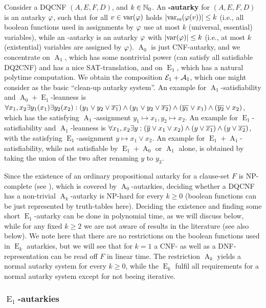 \documentclass[conference]{IEEEtran}
\DeclareMathOperator{\varess}{\var_{es}} %
\DeclareMathOperator{\Aaut}{A}
\DeclareMathOperator{\Eaut}{E}
\begin{document}
Consider a DQCNF $(A,E,F,D)$, and $k \in \mathbb{N}_0$. An \textbf{\bmm{\Aaut_k}-autarky} for $(A,E,F,D)$ is an autarky $\varphi$, such that for all $v \in \operatorname{var}(\varphi)$ holds $\abs{\varess(\vp(v))} \le k$ (i.e., all boolean functions used in assignments by $\varphi$ use at most $k$ (universal, essential) variables), while an {\bmm{\Eaut_k}-autarky} is an autarky $\varphi$ with $\lvert \operatorname{var}(\varphi) \rvert \le k$ (i.e., at most $k$ (existential) variables are assigned by $\varphi$).
$\Aaut_0$ is just CNF-autarky, and we concentrate on $\Aaut_1$, which has some nontrivial power (can satisfy all satisfiable DQ2CNF) and has a nice SAT-translation, and on $\Eaut_1$, which has a natural polytime computation. We obtain the composition $\mathcal{E}_1 + \mathcal{A}_1$, which one might consider as the basic ``clean-up autarky system''.
An example for $\Aaut_1$-satisfiability and $\Aaut_0+\Eaut_1$-leanness is $\forall x_1, x_2 \exists y_1(x_1) \exists y_2(x_2) : (y_1 \vee y_2 \vee \overline{x_1}) \wedge (y_1 \vee y_2 \vee \overline{x_2}) \wedge (\overline{y_1} \vee x_1) \wedge (\overline{y_2} \vee x_2)$, which has the satisfying $\Aaut_1$-assignment $y_1 \mapsto x_1, y_2 \mapsto x_2$.
An example for $\Eaut_1$-satisfiability and $\Aaut_1$-leanness is $\forall x_1,x_2 \exists y : (\overline{y} \vee x_1 \vee x_2) \wedge (y \vee \overline{x_1}) \wedge (y \vee \overline{x_2})$, with the satisfying $\Eaut_1$-assignment $y \mapsto x_1 \vee x_2$.
An example for $\Eaut_1 + \Aaut_1$-satisfiability, while not satisfiable by $\Eaut_1 + \Aaut_0$ or $\Aaut_1$ alone, is obtained by taking the union of the two after renaming $y$ to $y_3$.

Since the existence of an ordinary propositional autarky for a clause-set $F$ is NP-complete (see \cite{Ku00f}), which is covered by $\Aaut_0$-autarkies, deciding whether a DQCNF has a non-trivial $\Aaut_k$-autarky is NP-hard for every $k \ge 0$ (boolean functions can be just represented by truth-tables here).
Deciding the existence and finding some short $\Eaut_1$-autarky can be done in polynomial time, as we will discuss below, while for any fixed $k \ge 2$ we are not aware of results in the literature (see also below).
We note here that there are no restrictions on the boolean functions used in $\Eaut_k$ autarkies, but we will see that for $k=1$ a CNF- as well as a DNF-representation can be read off $F$ in linear time.
The restriction $\Aaut_k$ yields a normal autarky system for every $k \ge 0$, while the $\Eaut_k$ fulfil all requirements for a normal autarky system except for not beeing iterative.


\setcounter{subsubsection}{0}
\subsubsection{$\Eaut_1$-autarkies}
\label{sec:e1aut}
\end{document}
